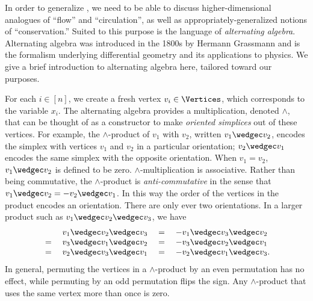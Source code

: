 \documentclass{toc}
\begin{document}
In order to generalize ,
we need to be able to discuss higher-dimensional analogues of ``flow''
and ``circulation'',
as well as appropriately-generalized notions of ``conservation.''
Suited to this purpose is the language of \emph{alternating algebra}.
Alternating algebra was introduced in the 1800s by Hermann Grassmann
\cite{Grassmann1844,GrassmannKannenberg2000} and is the formalism
underlying differential geometry and its applications to physics.
We give a brief introduction to alternating algebra here,
tailored toward our purposes.

For each \(i\in [n]\), we create a fresh vertex $v_i \in \Vertices$, 
which corresponds to the variable $x_i$.
The alternating algebra provides a multiplication, denoted \(\wedge\),
that can be thought of as a constructor to make \emph{oriented simplices}
out of these vertices.
For example, the \(\wedge\)-product of \(v_1\) with \(v_2\),
written \(v_1\wedgec v_2\), encodes the simplex with vertices
\(v_1\) and \(v_2\) in a particular orientation; \(v_2\wedgec v_1\) encodes the same simplex with the opposite orientation. 
When \(v_1=v_2\), \(v_1\wedgec v_2\) is defined to be zero.
\(\wedge\)-multiplication is associative.
Rather than being commutative,
the \(\wedge\)-product is \emph{anti-commutative} in the sense that
\(v_1\wedgec v_2=-v_2\wedgec v_1\).
In this way the order of the vertices in the product encodes
an orientation.
There are only ever two orientations.
In a larger product such as
\(v_1\wedgec v_2\wedgec v_3\),
we have
\[\begin{array}{crcl}
      &\;   v_1\wedgec v_2\wedgec v_3
  \;&=&\; - v_1\wedgec v_3\wedgec v_2 \\
  \; =&\;   v_3\wedgec v_1\wedgec v_2
  \;&=&\; - v_3\wedgec v_2\wedgec v_1 \\
  \; =&\;   v_2\wedgec v_3\wedgec v_1
  \;&=&\; - v_2\wedgec v_1\wedgec v_3.
\end{array}\]
In general, permuting the vertices in a \(\wedge\)-product by an
even permutation has no effect,
while permuting by an odd permutation flips the sign.
Any \(\wedge\)-product that uses the same vertex more than once is
zero.
\end{document}
